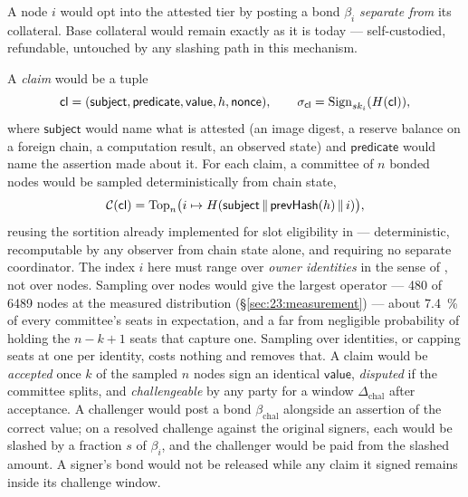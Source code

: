 \begin{construction}
\label{cons:bonded-network}
A node $i$ would opt into the attested tier by posting a bond $\beta_i$ \emph{separate from} its
\FluxNode collateral. Base collateral would remain exactly as it is today — self-custodied,
refundable, untouched by any slashing path in this mechanism.

A \emph{claim} would be a tuple
$$
\mathsf{cl} = (\mathsf{subject}, \mathsf{predicate}, \mathsf{value}, h, \mathsf{nonce}), \qquad
\sigma_{\mathsf{cl}} = \mathrm{Sign}_{sk_i}(H(\mathsf{cl})),
$$
where $\mathsf{subject}$ would name what is attested (an image digest, a reserve balance on a
foreign chain, a computation result, an observed state) and $\mathsf{predicate}$ would name the
assertion made about it. For each claim, a committee of $n$ bonded nodes would be sampled
deterministically from chain state,
$$
\mathcal{C}(\mathsf{cl}) = \mathrm{Top}_n\bigl(i \mapsto H(\mathsf{subject} \,\|\, \mathsf{prevHash}(h) \,\|\, i)\bigr),
$$
reusing the sortition already implemented for \PoN slot eligibility in \fluxd — deterministic,
recomputable by any observer from chain state alone, and requiring no separate coordinator. The
index $i$ here must range over \emph{owner identities} in the sense of , not
over nodes. Sampling over nodes would give the largest operator — \num{480} of \num{6489} nodes at
the measured distribution (\S\ref{sec:23:measurement}) — about \SI{7.4}{\percent} of every
committee's seats in expectation, and a far from negligible probability of holding the $n-k+1$ seats
that capture one. Sampling over identities, or capping seats at one per identity, costs nothing and
removes that. A claim
would be \emph{accepted} once $k$ of the sampled $n$ nodes sign an identical $\mathsf{value}$,
\emph{disputed} if the committee splits, and \emph{challengeable} by any party for a window
$\Delta_{\mathrm{chal}}$ after acceptance. A challenger would post a bond $\beta_{\mathrm{chal}}$
alongside an assertion of the correct value; on a resolved challenge against the original signers,
each would be slashed by a fraction $s$ of $\beta_i$, and the challenger would be paid from the
slashed amount. A signer's bond would not be released while any claim it signed remains inside its
challenge window. 
\end{construction}

